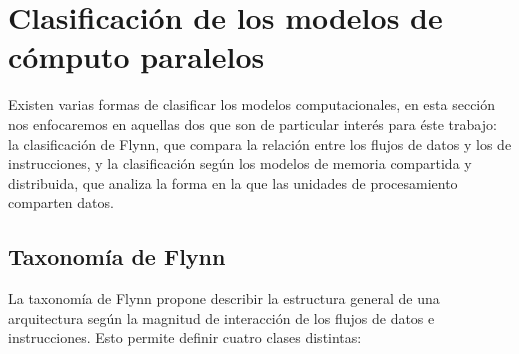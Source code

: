 
\section{Clasificación de los modelos de cómputo paralelos}

\label{mt_modelosparalelos}

Existen varias formas de clasificar los modelos computacionales, en esta
sección nos enfocaremos en aquellas dos que son de particular interés para éste
trabajo: la clasificación de Flynn, que compara la relación entre los flujos de
datos y los de instrucciones, y la clasificación según los modelos de memoria
compartida y distribuida, que analiza la forma en la que las unidades de
procesamiento comparten datos.

\subsection{Taxonomía de Flynn}

La taxonomía de Flynn \cite{flynnstaxonomy1972} propone describir la estructura
general de una arquitectura según la magnitud de interacción de los flujos de
datos e instrucciones. Esto permite definir cuatro clases distintas:

